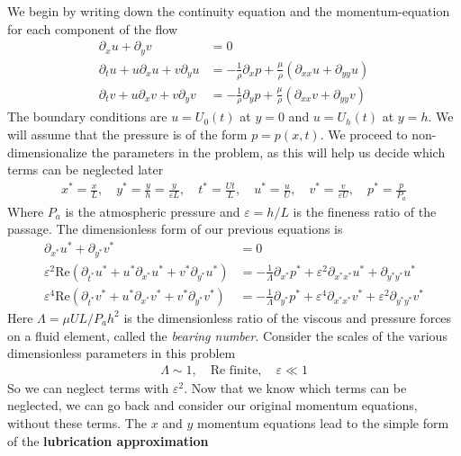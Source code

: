 \documentclass[a4paper, 12pt]{article}
\numberwithin{equation}{subsubsection}
\begin{document}
We begin by writing down the continuity equation and the momentum-equation for each component of the flow
\begin{align}
	\partial_x u + \partial_y v &= 0 \\
	\partial_t u + u \partial_x u + v \partial_y u &= -\frac{1}{\rho} \partial_x p + \frac{\mu}{\rho}(\partial_{xx} u + \partial_{yy} u) \\
	\partial_t v + u \partial_x v + v \partial_y v &= -\frac{1}{\rho} \partial_y p + \frac{\mu}{\rho}(\partial_{xx} v + \partial_{yy} v)
\end{align}
The boundary conditions are $u = U_0(t)$ at $y=0$ and $u = U_h(t)$ at $y=h$. We will assume that the pressure is of the form $p=p(x,t)$. We proceed to non-dimensionalize the parameters in the problem, as this will help us decide which terms can be neglected later
\begin{align}
	x^* = \frac{x}{L}, \quad y^* = \frac{y}{h} = \frac{y}{\varepsilon L}, \quad t^* = \frac{Ut}{L}, \quad u^* = \frac{u}{U}, \quad v^* = \frac{v}{\varepsilon U}, \quad p^* = \frac{p}{P_a}
\end{align}
Where $P_a$ is the atmospheric pressure and $\varepsilon = h/L$ is the fineness ratio of the passage. The dimensionless form of our previous equations is
\begin{align}
	\partial_{x^*} u^* + \partial_{y^*} v^* &= 0 \\
	\varepsilon^2 \text{Re} (\partial_{t^*} u^* + u^* \partial_{x^*} u^* + v^* \partial_{y^*} u^*) &= - \frac{1}{\Lambda} \partial_{x^*} p^* + \varepsilon^2 \partial_{x^* x^*} u^* + \partial_{y^* y^*} u^* \\
	\varepsilon^4 \text{Re} (\partial_{t^*} v^* + u^* \partial_{x^*} v^* + v^* \partial_{y^*} v^*) &= - \frac{1}{\Lambda} \partial_{y^*} p^* + \varepsilon^4 \partial_{x^* x^*} v^* + \varepsilon^2 \partial_{y^* y^*} v^*
\end{align}
Here $\Lambda = \mu U L / P_ah^2$ is the dimensionless ratio of the viscous and pressure forces on a fluid element, called the \textit{bearing number}. Consider the scales of the various dimensionless parameters in this problem
\begin{align*}
	\Lambda \sim 1, \quad \text{Re} \text{ finite}, \quad \varepsilon \ll 1
\end{align*}
So we can neglect terms with $\varepsilon^2$. Now that we know which terms can be neglected, we can go back and consider our original momentum equations, without these terms. The $x$ and $y$ momentum equations lead to the simple form of the \textbf{lubrication approximation}
\end{document}
